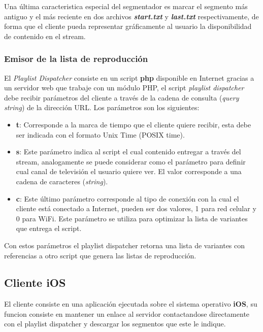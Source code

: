 Una última caracteristica especial del segmentador es marcar el segmento más antiguo y el más reciente en dos archivos \textbf{\textit{start.txt}} y \textbf{\textit{last.txt}} respectivamente, de forma que el cliente pueda representar gráficamente al usuario la disponibilidad de contenido en el stream.
		
		\subsubsection{Emisor de la lista de reproducción}
El \textit{Playlist Dispatcher} consiste en un script \textbf{php} disponible en Internet gracias a un servidor web que trabaje con un módulo PHP, el script \textit{playlist dispatcher} debe recibir parámetros del cliente a través de la cadena de consulta (\textit{query string}) de la dirección URL. Los parámetros son los siguientes:

\begin{itemize}
	\item \textbf{t}: Corresponde a la marca de tiempo que el cliente quiere recibir, esta debe ser indicada con el formato Unix Time (POSIX time).
	\item \textbf{s}: Este parámetro indica al script el cual contenido entregar a través del stream, analogamente se puede considerar como el parámetro para definir cual canal de televisión el usuario quiere ver. El valor corresponde a una cadena de caracteres (\textit{string}).
	\item \textbf{c}: Este último parámetro corresponde al tipo de conexión con la cual el cliente está conectado a Internet, pueden ser dos valores, 1 para red celular y 0 para WiFi. Este parámetro se utiliza para optimizar la lista de variantes que entrega el script.
\end{itemize}
		
Con estos parámetros el playlist dispatcher retorna una lista de variantes con referencias a otro script que genera las listas de reproducción.
		
	\subsection{Cliente iOS}
El cliente consiste en una aplicación ejecutada sobre el sistema operativo \textbf{iOS}, su funcion consiste en mantener un enlace al servidor contactandose directamente con el playlist dispatcher y descargar los segmentos que este le indique.\\

